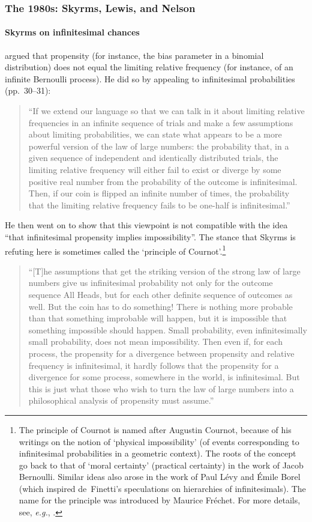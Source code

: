 \subsubsection{The 1980s: Skyrms, Lewis, and Nelson}

\paragraph{Skyrms on infinitesimal chances}
\citet{Skyrms:1980} argued that propensity (for instance, the bias parameter in a binomial distribution) does not equal the limiting relative frequency (for instance, of an infinite Bernoulli process). He did so by appealing to infinitesimal probabilities (pp.~30--31):
\begin{quote}
``If we extend our language so that we can talk in it about limiting relative frequencies in an infinite sequence of trials and make a few assumptions about limiting probabilities, we can state what appears to be a more powerful version of the law of large numbers: the probability that, in a given sequence of independent and identically distributed trials, the limiting relative frequency will either fail to exist or diverge by some positive real number from the probability of the outcome is infinitesimal. Then, if our coin is flipped an infinite number of times, the probability that the limiting relative frequency fails to be one-half is infinitesimal.''
\end{quote}
He then went on to show that this viewpoint is not compatible with the idea ``that infinitesimal propensity implies impossibility''. The stance that Skyrms is refuting here is sometimes called the `principle of Cournot'.\footnote{\label{fn:Cournot}The principle of Cournot is named after Augustin Cournot, because of his writings on the notion of `physical impossibility' (of events corresponding to infinitesimal probabilities in a geometric context). The roots of the concept go back to that of `moral certainty' (practical certainty) in the work of Jacob Bernoulli. Similar ideas also arose in the work of Paul L{\'e}vy and {\'E}mile Borel (which inspired de~Finetti's speculations on hierarchies of infinitesimals). The name for the principle was introduced by Maurice Fr{\'e}chet. For more details, see, \textit{e.g.}, \citet{Shafer:2008}.}
\begin{quote}
``[T]he assumptions that get the striking version of the strong law of large numbers give us infinitesimal probability not only for the outcome sequence All Heads, but for each other definite sequence of outcomes as well. But the coin has to do something! There is nothing more probable than that something improbable will happen, but it is impossible that something impossible should happen. Small probability, even infinitesimally small probability, does not mean impossibility. Then even if, for each process, the propensity for a divergence between propensity and relative frequency is infinitesimal, it hardly follows that the propensity for a divergence for some process, somewhere in the world, is infinitesimal. But this is just what those who wish to turn the law of large numbers into a philosophical analysis of propensity must assume.''
\end{quote}
